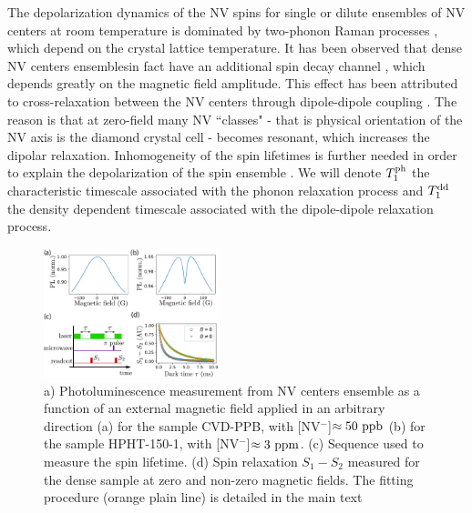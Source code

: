 \documentclass[preprintnumbers,amsmath,amssymb,superscriptaddress,twocolumn,showpacs]{revtex4-2}
\begin{document}
The depolarization dynamics of the NV spins for single or dilute ensembles of NV centers at room temperature is dominated by two-phonon Raman processes \citep{redman1991spin,jarmola_temperature-_2012,norambuena2018spin}, which depend on the crystal lattice temperature. It has been observed that dense NV centers ensemblesin fact  have an additional spin decay channel \citep{jarmola_temperature-_2012,jarmola_longitudinal_2015,mrozek_longitudinal_2015, choi2017depolarization, akhmedzhanov_microwave-free_2017, akhmedzhanov_magnetometry_2019, pellet2021magnetic, mrozek2021characterization}, which depends greatly on the magnetic field amplitude. This effect has been attributed to cross-relaxation between the NV centers through dipole-dipole coupling \citep{mrozek_longitudinal_2015, choi2017depolarization}. 
The reason is that at zero-field many NV ``classes" - that is physical orientation of the NV axis is the diamond crystal cell - becomes resonant, which increases the dipolar relaxation.
Inhomogeneity of the spin lifetimes is further needed in order to explain the depolarization of the spin ensemble \citep{choi2017depolarization}. We will denote $T_1^{\rm ph}$ the characteristic timescale associated with the phonon relaxation process and $T_1^{\rm dd}$ the density dependent timescale associated with the dipole-dipole relaxation process.

\begin{figure}
\includegraphics[width=0.45\textwidth]{Figures/fig_T1.pdf}
\caption{a) Photoluminescence measurement from NV centers ensemble as a function of an external magnetic field applied in an arbitrary direction (a) for the sample CVD-PPB, with [NV$^-$]$\approx 50\ \rm ppb$ (b) for the sample HPHT-150-1, with [NV$^-$]$\approx 3\ \rm ppm$. (c) Sequence used to measure the spin lifetime. (d) Spin relaxation $S_1-S_2$ measured for the dense sample at zero and non-zero magnetic fields. The fitting procedure (orange plain line) is detailed in the main text}
\label{T1}
\end{figure}
\end{document}
